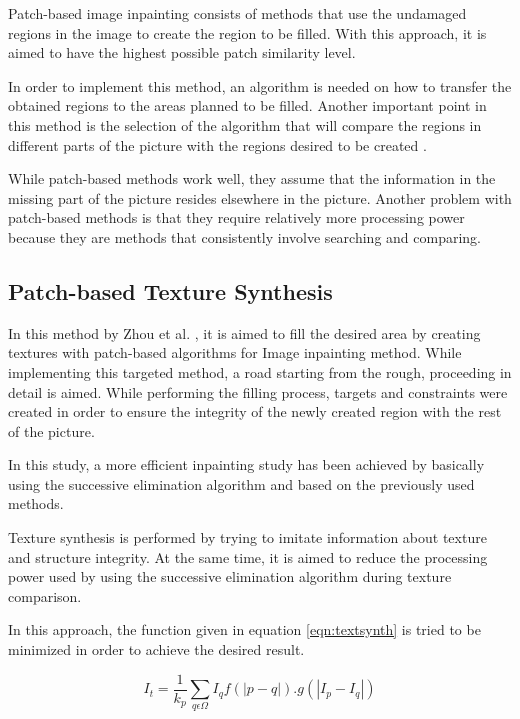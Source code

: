 Patch-based image inpainting consists of methods that use the undamaged regions in the image to create the region to be filled. With this approach, it is aimed to have the highest possible patch similarity level\cite{inpaintingoverview}.

In order to implement this method, an algorithm is needed on how to transfer the obtained regions to the areas planned to be filled. Another important point in this method is the selection of the algorithm that will compare the regions in different parts of the picture with the regions desired to be created \cite{patchmatch}.

While patch-based methods work well, they assume that the information in the missing part of the picture resides elsewhere in the picture. Another problem with patch-based methods is that they require relatively more processing power because they are methods that consistently involve searching and comparing.

\subsection{Patch-based Texture Synthesis}

In this method by Zhou et al. \cite{patch_based_tex_synthesis}, it is aimed to fill the desired area by creating textures with patch-based algorithms for Image inpainting method. While implementing this targeted method, a road starting from the rough, proceeding in detail is aimed. While performing the filling process, targets and constraints were created in order to ensure the integrity of the newly created region with the rest of the picture.

In this study, a more efficient inpainting study has been achieved by basically using the successive elimination algorithm and based on the previously used methods.

Texture synthesis is performed by trying to imitate information about texture and structure integrity. At the same time, it is aimed to reduce the processing power used by using the successive elimination algorithm during texture comparison.

In this approach, the function given in equation \ref{eqn:textsynth} is tried to be minimized in order to achieve the desired result.

\begin{equation}
    \label{eqn:textsynth}
    I_t = \frac{1}{k_p} \displaystyle\sum\limits_{q\epsilon\Omega} {I_qf(|p-q|).g(|I_p-I_q|)}
\end{equation}

